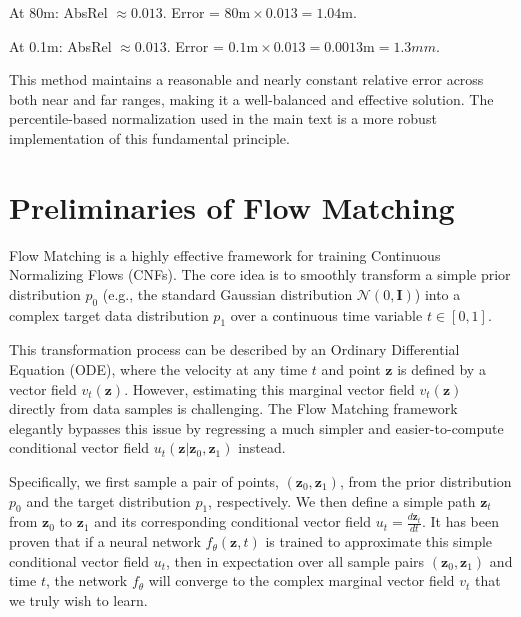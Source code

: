 \documentclass{article} %
\begin{document}
{At 80m}:
AbsRel $\approx {0.013}$.
Error = $80\text{m} \times 0.013 = 1.04\text{m}$.

{At 0.1m}:
AbsRel $\approx {0.013}$.
Error = $0.1\text{m} \times 0.013 = 0.0013\text{m} = {1.3mm}$.
        
This method maintains a reasonable and nearly constant relative error across both near and far ranges, making it a well-balanced and effective solution. The percentile-based normalization used in the main text is a more robust implementation of this fundamental principle.

\section{Preliminaries of Flow Matching}
\label{supp:flow}

Flow Matching \citep{flowmatch} is a highly effective framework for training Continuous Normalizing Flows (CNFs). The core idea is to smoothly transform a simple prior distribution $p_0$ (e.g., the standard Gaussian distribution $\mathcal{N}(0, \mathbf{I})$) into a complex target data distribution $p_1$ over a continuous time variable $t \in [0, 1]$.

This transformation process can be described by an Ordinary Differential Equation (ODE), where the velocity at any time $t$ and point $\mathbf{z}$ is defined by a vector field $v_t(\mathbf{z})$. However, estimating this marginal vector field $v_t(\mathbf{z})$ directly from data samples is challenging. The Flow Matching framework elegantly bypasses this issue by regressing a much simpler and easier-to-compute conditional vector field $u_t(\mathbf{z} | \mathbf{z}_0, \mathbf{z}_1)$ instead.

Specifically, we first sample a pair of points, $(\mathbf{z}_0, \mathbf{z}_1)$, from the prior distribution $p_0$ and the target distribution $p_1$, respectively. We then define a simple path $\mathbf{z}_t$ from $\mathbf{z}_0$ to $\mathbf{z}_1$ and its corresponding conditional vector field $u_t = \frac{d\mathbf{z}_t}{dt}$. It has been proven that if a neural network $f_\theta(\mathbf{z}, t)$ is trained to approximate this simple conditional vector field $u_t$, then in expectation over all sample pairs $(\mathbf{z}_0, \mathbf{z}_1)$ and time $t$, the network $f_\theta$ will converge to the complex marginal vector field $v_t$ that we truly wish to learn.
\end{document}
